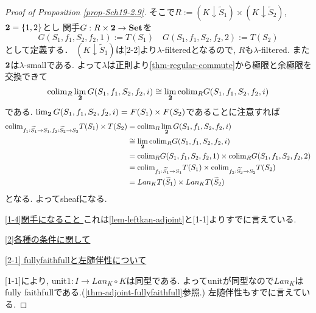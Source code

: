 \documentclass[dvipdfmx,a4paper,11pt]{article}
\newcommand{\colim}{{\rm colim}}
\theoremstyle{definition}
\begin{document}
\begin{proof}[Proof of Proposition \ref{prop-Sch19-2.9}]
そこで$R := (K \downarrow  \widetilde{S}_1) \times (K \downarrow  \widetilde{S}_2) $, ${\bf 2}=\{ 1,2\}$とし
関手$G : R \times {\bf 2} \to {\bf Set}$を
$$G(S_1, f_1, S_2, f_2, 1) := T(S_1)
\quad
G(S_1, f_1, S_2, f_2, 2) := T(S_2)
$$
として定義する．
$(K \downarrow  \widetilde{S}_1) $は[2-2]より$\lambda$-filteredとなるので, $R$も$\lambda$-filtered. 
また${\bf 2}$は$\lambda$-smallである. 
よって$\lambda$は正則より\ref{thm-regular-commute}から極限と余極限を交換できて
$$
\colim_{R} \lim_{{\bf2}}G(S_1, f_1, S_2, f_2, i)
\cong 
\lim_{{\bf2}}\colim_{R} G(S_1, f_1, S_2, f_2, i)
$$
である. 
$\lim_{{\bf2}}G(S_1, f_1, S_2, f_2, i) =F(S_1) \times F (S_2)$であることに注意すれば
\begin{align*}
\begin{split}
\colim_{f_1 : \widetilde{S_1} \to S_1,  f_2 : \widetilde{S_2} \to S_2} T(S_1) \times  T( S_2)
&=\colim_{R} \lim_{{\bf2}}G(S_1, f_1, S_2, f_2, i)\\
& \cong \lim_{{\bf2}}\colim_{R} G(S_1, f_1, S_2, f_2, i) \\
&= \colim_{R} G(S_1, f_1, S_2, f_2, 1)  \times \colim_{R} G(S_1, f_1, S_2, f_2, 2) \\
&=\colim_{f_1 : \widetilde{S_1} \to S_1 } T(S_1) \times  \colim_{ f_2 : \widetilde{S_2} \to S_2}T( S_2) \\
&= Lan_{K}T(\widetilde{S}_1) \times Lan_{K}T(\widetilde{S}_2) 
\end{split}
\end{align*}
となる. 
よってsheafになる. 

\underline{[1-4]関手になること } 
これは\ref{lem-leftkan-adjoint}と[1-1]よりすでに言えている. 

\vspace{5pt}
\underline{[2]各種の条件に関して}

\underline{[2-1] fullyfaithfullと左随伴性について}

[1-1]により, unit$1 : I \to Lan_{K} \circ K$は同型である. 
よってunitが同型なので$Lan_{K}$はfully faithfullである.(\ref{thm-adjoint-fullyfaithfull}参照.)
左随伴性もすでに言えている. 


\end{proof}
\end{document}
